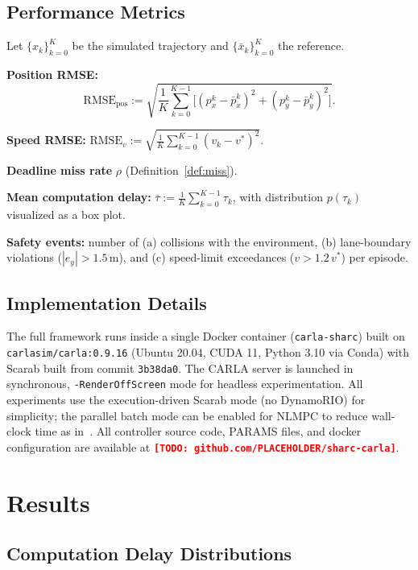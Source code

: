 \documentclass[conference]{IEEEtran}
\newcommand{\RMSE}{\mathrm{RMSE}}
\newcommand{\TODO}[1]{\textcolor{red}{\textbf{[TODO: #1]}}}
\begin{document}
\subsection{Performance Metrics}

Let $\{x_k\}_{k=0}^K$ be the simulated trajectory and
$\{\bar{x}_k\}_{k=0}^K$ the reference.

\noindent\textbf{Position RMSE:}
\begin{equation}\label{eq:rmse}
  \RMSE_{\mathrm{pos}} :=
  \sqrt{\frac{1}{K}\sum_{k=0}^{K-1}
    \bigl[(p_x^k - \bar{p}_x^k)^2 + (p_y^k - \bar{p}_y^k)^2\bigr]}.
\end{equation}

\noindent\textbf{Speed RMSE:}
$\RMSE_v := \sqrt{\frac{1}{K}\sum_{k=0}^{K-1}(v_k - v^*)^2}$.

\noindent\textbf{Deadline miss rate} $\rho$ (Definition~\ref{def:miss}).

\noindent\textbf{Mean computation delay:}
$\bar{\tau} := \frac{1}{K}\sum_{k=0}^{K-1} \tau_k$, with distribution
$p(\tau_k)$ visualized as a box plot.

\noindent\textbf{Safety events:} number of (a) collisions with the
environment, (b) lane-boundary violations ($|e_y| > 1.5$\,m), and
(c) speed-limit exceedances ($v > 1.2\,v^*$) per episode.

\subsection{Implementation Details}

The full framework runs inside a single Docker container
(\texttt{carla-sharc}) built on \texttt{carlasim/carla:0.9.16}
(Ubuntu 20.04, CUDA 11, Python 3.10 via Conda) with Scarab built from
commit \texttt{3b38da0}.  The CARLA server is launched in synchronous,
\texttt{-RenderOffScreen} mode for headless experimentation.  All
experiments use the execution-driven Scarab mode (no DynamoRIO) for
simplicity; the parallel batch mode can be enabled for NLMPC to reduce
wall-clock time as in~\cite{wintz2025sharc}.  All controller source
code, PARAMS files, and docker configuration are available at
\texttt{\TODO{github.com/PLACEHOLDER/sharc-carla}}.

\section{Results}\label{sec:results}

\subsection{Computation Delay Distributions}
\end{document}
